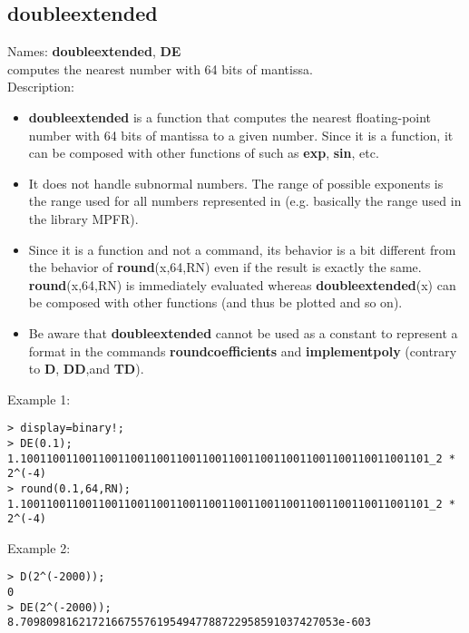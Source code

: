 \subsection{doubleextended}
\label{labdoubleextended}
\noindent Names: \textbf{doubleextended}, \textbf{DE}\\
computes the nearest number with 64 bits of mantissa.\\

\noindent Description: \begin{itemize}

\item \textbf{doubleextended} is a function that computes the nearest floating-point number with
   64 bits of mantissa to a given number. Since it is a function, it can be
   composed with other functions of \sollya such as \textbf{exp}, \textbf{sin}, etc.

\item It does not handle subnormal numbers. The range of possible exponents is the 
   range used for all numbers represented in \sollya (e.g. basically the range 
   used in the library MPFR).

\item Since it is a function and not a command, its behavior is a bit different from 
   the behavior of \textbf{round}(x,64,RN) even if the result is exactly the same.
   \textbf{round}(x,64,RN) is immediately evaluated whereas \textbf{doubleextended}(x) can be composed 
   with other functions (and thus be plotted and so on).

\item Be aware that \textbf{doubleextended} cannot be used as a constant to represent a format in the
   commands \textbf{roundcoefficients} and \textbf{implementpoly} (contrary to \textbf{D}, \textbf{DD},and \textbf{TD}).
\end{itemize}
\noindent Example 1: 
\begin{center}\begin{minipage}{15cm}\begin{Verbatim}[frame=single]
> display=binary!;
> DE(0.1);
1.100110011001100110011001100110011001100110011001100110011001101_2 * 2^(-4)
> round(0.1,64,RN);
1.100110011001100110011001100110011001100110011001100110011001101_2 * 2^(-4)
\end{Verbatim}
\end{minipage}\end{center}
\noindent Example 2: 
\begin{center}\begin{minipage}{15cm}\begin{Verbatim}[frame=single]
> D(2^(-2000));
0
> DE(2^(-2000));
8.7098098162172166755761954947788722958591037427053e-603
\end{Verbatim}
\end{minipage}\end{center}
